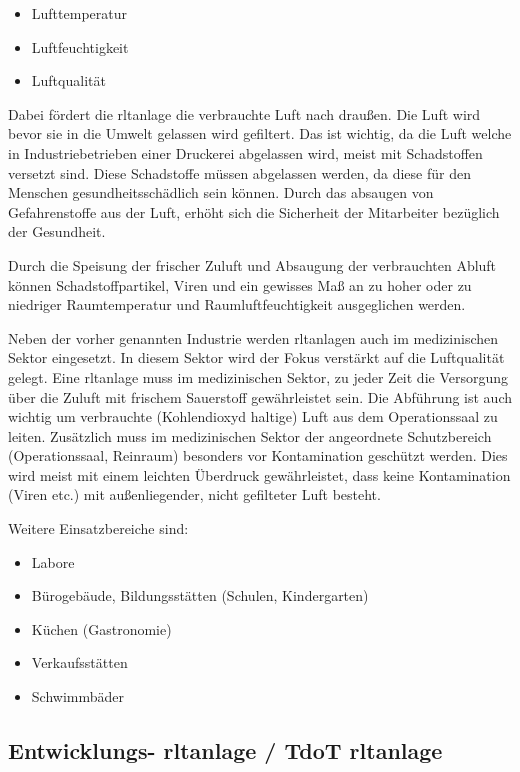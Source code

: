 \begin{itemize}
	\item Lufttemperatur
	\item Luftfeuchtigkeit
	\item Luftqualität
\end{itemize} 

Dabei fördert die \ac{rltanlage} die verbrauchte Luft nach draußen. Die Luft wird bevor sie in die Umwelt gelassen wird gefiltert. Das ist wichtig, da die Luft welche in Industriebetrieben \zB einer Druckerei abgelassen wird, meist mit Schadstoffen versetzt sind. Diese Schadstoffe müssen abgelassen werden, da diese für den Menschen gesundheitsschädlich sein können. Durch das absaugen von Gefahrenstoffe aus der Luft, erhöht sich die Sicherheit der Mitarbeiter bezüglich der Gesundheit.

Durch die Speisung der frischer Zuluft und Absaugung der verbrauchten Abluft können Schadstoffpartikel, Viren und ein gewisses Maß an zu hoher oder zu niedriger Raumtemperatur und Raumluftfeuchtigkeit ausgeglichen werden. 
\cite[vgl.][]{DGWZ:o.J.}

Neben der vorher genannten Industrie werden \ac{rltanlage}n auch im medizinischen Sektor eingesetzt. In diesem Sektor wird der Fokus verstärkt auf die Luftqualität gelegt. Eine \ac{rltanlage} muss im medizinischen Sektor, zu jeder Zeit die Versorgung über die Zuluft mit frischem Sauerstoff gewährleistet sein. Die Abführung ist auch wichtig um verbrauchte (Kohlendioxyd haltige) Luft aus dem Operationssaal zu leiten. Zusätzlich muss im medizinischen Sektor der angeordnete Schutzbereich (\zB Operationssaal, Reinraum) besonders vor Kontamination geschützt werden. Dies wird meist mit einem leichten Überdruck gewährleistet, dass keine Kontamination (Viren etc.) mit außenliegender, nicht gefilteter Luft besteht.
\cite[vgl.][]{robatherm:2019,robatherm:o.J.}

Weitere Einsatzbereiche sind:
\begin{itemize}
	\item Labore
	\item Bürogebäude, Bildungsstätten (Schulen, Kindergarten)
	\item Küchen (Gastronomie)
	\item Verkaufsstätten
	\item Schwimmbäder
\end{itemize} 
\cite[vgl.][]{robatherm:2019,induux_wiki:2023}

\subsection{Entwicklungs- \ac{rltanlage} / TdoT \ac{rltanlage}}

